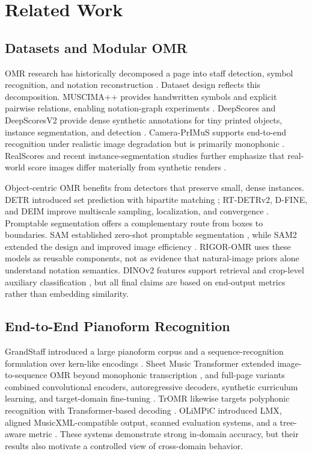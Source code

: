 \section{Related Work}
\subsection{Datasets and Modular OMR}
OMR research has historically decomposed a page into staff detection, symbol recognition, and notation reconstruction \cite{calvozaragoza2021understanding,rebelo2012optical}. Dataset design reflects this decomposition. MUSCIMA++ provides handwritten symbols and explicit pairwise relations, enabling notation-graph experiments \cite{hajic2017muscima}. DeepScores and DeepScoresV2 provide dense synthetic annotations for tiny printed objects, instance segmentation, and detection \cite{tuggener2018deepscores,tuggener2020deepscoresv2}. Camera-PrIMuS supports end-to-end recognition under realistic image degradation but is primarily monophonic \cite{calvozaragoza2018primus}. RealScores and recent instance-segmentation studies further emphasize that real-world score images differ materially from synthetic renders \cite{shatri2023realworld,shatri2024segmentation}.

Object-centric OMR benefits from detectors that preserve small, dense instances. DETR introduced set prediction with bipartite matching \cite{carion2020detr}; RT-DETRv2, D-FINE, and DEIM improve multiscale sampling, localization, and convergence \cite{lv2024rtdetrv2,peng2025dfine,huang2025deim}. Promptable segmentation offers a complementary route from boxes to boundaries. SAM established zero-shot promptable segmentation \cite{kirillov2023segment}, while SAM2 extended the design and improved image efficiency \cite{ravi2025sam2}. RIGOR-OMR uses these models as reusable components, not as evidence that natural-image priors alone understand notation semantics. DINOv2 features support retrieval and crop-level auxiliary classification \cite{oquab2023dinov2}, but all final claims are based on end-output metrics rather than embedding similarity.

\subsection{End-to-End Pianoform Recognition}
GrandStaff introduced a large pianoform corpus and a sequence-recognition formulation over kern-like encodings \cite{riosvila2023grandstaff}. Sheet Music Transformer extended image-to-sequence OMR beyond monophonic transcription \cite{riosvila2024smt}, and full-page variants combined convolutional encoders, autoregressive decoders, synthetic curriculum learning, and target-domain fine-tuning \cite{riosvila2026fullpage}. TrOMR likewise targets polyphonic recognition with Transformer-based decoding \cite{li2023tromr}. OLiMPiC introduced LMX, aligned MusicXML-compatible output, scanned evaluation systems, and a tree-aware metric \cite{mayer2024practical}. These systems demonstrate strong in-domain accuracy, but their results also motivate a controlled view of cross-domain behavior.

